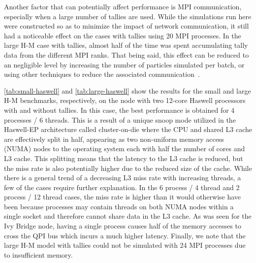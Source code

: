 \documentclass{mc2015}
\begin{document}
Another factor that can potentially affect performance is MPI communication,
especially when a large number of tallies are used. While the simulations run
here were constructed so as to minimize the impact of network communication, it
still had a noticeable effect on the cases with tallies using 20 MPI
processes. In the large H-M case with tallies, almost half of the time was spent
accumulating tally data from the different MPI ranks. That being said,
this effect can be reduced to an negligible level by increasing the number of
particles simulated per batch, or using other techniques to reduce the
associated communication~\cite{trans-romano-2012}.

\autoref{tab:small-haswell} and \autoref{tab:large-haswell} show the results for
the small and large H-M benchmarks, respectively, on the node with two 12-core
Haswell processors with and without tallies. In this case, the best performance
is obtained for 4 processes / 6 threads. This is a result of a unique snoop mode
utilized in the Haswell-EP architecture called cluster-on-die where the CPU and
shared L3 cache are effectively split in half, appearing as two non-uniform
memory access (NUMA) nodes to the operating system each with half the number of
cores and L3 cache. This splitting means that the latency to the L3 cache is
reduced, but the miss rate is also potentially higher due to the reduced size of
the cache. While there is a general trend of a decreasing L3 miss rate with
increasing threads, a few of the cases require further explanation. In the 6
process / 4 thread and 2 process / 12 thread cases, the miss rate is higher than
it would otherwise have been because processes may contain threads on both NUMA
nodes within a single socket and therefore cannot share data in the L3 cache. As
was seen for the Ivy Bridge node, having a single process causes half of the
memory accesses to cross the QPI bus which incurs a much higher
latency. Finally, we note that the large H-M model with tallies could not be
simulated with 24 MPI processes due to insufficient memory.
\end{document}
